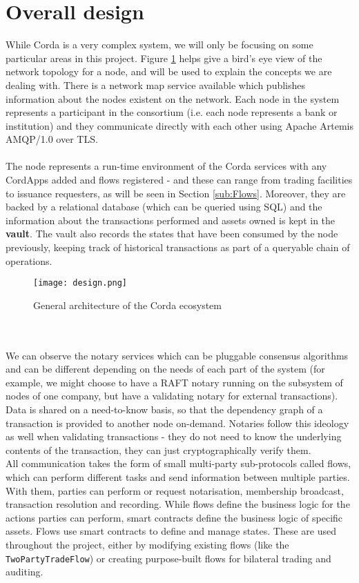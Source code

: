 \documentclass[12pt,twoside]{article}
\begin{document}
\section{Overall design}
\label{sec:Design}
While Corda is a very complex system, we will only be focusing on some particular areas in this project. Figure \ref{fig:design} helps give a bird's eye view of the network topology for a node, and will be used to explain the concepts we are dealing with. There is a network map service available which publishes information about the nodes existent on the network. Each node in the system represents a participant in the consortium (i.e. each node represents a bank or institution) and they communicate directly with each other using Apache Artemis AMQP/1.0 over TLS. 
\\ \\
The node represents a run-time environment of the Corda services with any CordApps added and flows registered - and these can range from trading facilities to issuance requesters, as will be seen in Section \ref{sub:Flows}. Moreover, they are backed by a relational database (which can be queried using SQL) and the information about the transactions performed and assets owned is kept in the \textbf{vault}. The vault also records the states that have been consumed by the node previously, keeping track of historical transactions as part of a queryable chain of operations.
\begin{figure}[!htb]
\centering
\texttt{[image: design.png]}
\caption{General architecture of the Corda ecosystem \cite{fig:design}}
\centering
\label{fig:design}
\end{figure}
\\ \\
We can observe the notary services which can be pluggable consensus algorithms and can be different depending on the needs of each part of the system (for example, we might choose to have a RAFT notary running on the subsystem of nodes of one company, but have a validating notary for external transactions). Data is shared on a need-to-know basis, so that the dependency graph of a transaction is provided to another node on-demand. Notaries follow this ideology as well when validating transactions - they do not need to know the underlying contents of the transaction, they can just cryptographically verify them.
\\
All communication takes the form of small multi-party sub-protocols called flows, which can perform different tasks and send information between multiple parties. With them, parties can perform or request notarisation, membership broadcast, transaction resolution and recording. While flows define the business logic for the actions parties can perform, smart contracts define the business logic of specific assets. Flows use smart contracts to define and manage states. These are used throughout the project, either by modifying existing flows (like the \verb|TwoPartyTradeFlow|) or creating purpose-built flows for bilateral trading and auditing.
\end{document}
